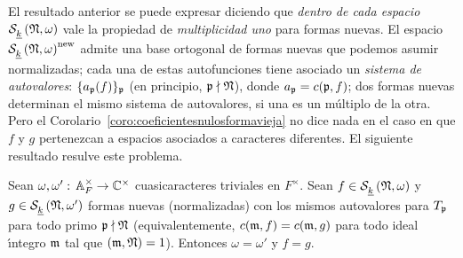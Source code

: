 El resultado anterior se puede expresar diciendo que \emph{dentro de cada %
espacio $\spitzH{k}{\frak{N},\omega}$} vale la propiedad de
\emph{multiplicidad uno} para formas nuevas.
El espacio $\spitzH{k}{\frak{N},\omega}^\neue$ admite una base ortogonal de
formas nuevas que podemos asumir normalizadas; cada una de estas autofunciones
tiene asociado un \emph{sistema de autovalores}:
$\{a_{\frak{p}}(f)\}_{\frak{p}}$ (en principio, $\frak{p}\nmid\frak{N}$), donde
$a_{\frak{p}}=c(\frak{p},f)$; dos formas nuevas determinan el mismo sistema de
autovalores, si una es un m\'{u}ltiplo de la otra.
Pero el Corolario~\ref{coro:coeficientesnulosformavieja} no dice nada en el
caso en que $f$ y $g$ pertenezcan a espacios asociados a caracteres diferentes.
El siguiente resultado resulve este problema.

\begin{teoFormasNuevasMismosAutovalores}%
	[ver {\cite[Thm.~3,6]{ShemanskeWalling}}]%
	\label{thm:formasnuevasmismosautovalores}
	Sean $\omega,\omega':\,\ideles{F}\rightarrow\bb{C}^{\times}$
	cuasicaracteres triviales en $F^{\times}$. Sean
	$f\in\spitzH{k}{\frak{N},\omega}$ y $g\in\spitzH{k}{\frak{N},\omega'}$
	formas nuevas (normalizadas) con los mismos autovalores para
	$T_{\frak{p}}$ para todo primo $\frak{p}\nmid\frak{N}$
	(equivalentemente, $c(\frak{m},f)=c(\frak{m},g)$ para todo ideal
	\'{\i}ntegro $\frak{m}$ tal que $(\frak{m},\frak{N})=1$). Entonces
	$\omega=\omega'$ y $f=g$.
\end{teoFormasNuevasMismosAutovalores}
